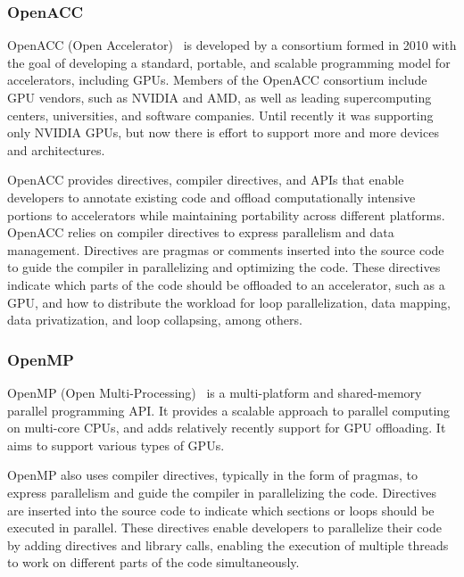 \subsubsection{OpenACC}

\par
OpenACC (Open Accelerator)~\cite{openacc} is developed by a consortium formed in 2010 with the goal of developing a standard, portable, and scalable programming model for accelerators, including GPUs.
Members of the OpenACC consortium include GPU vendors, such as NVIDIA and AMD, as well as leading supercomputing centers, universities, and software companies.
Until recently it was supporting only NVIDIA GPUs, but now there is effort to support more and more devices and architectures.


\par
OpenACC provides directives, compiler directives, and APIs that enable developers to annotate existing code and offload computationally intensive portions to accelerators while maintaining portability across different platforms.
OpenACC relies on compiler directives to express parallelism and data management.
Directives are pragmas or comments inserted into the source code to guide the compiler in parallelizing and optimizing the code.
These directives indicate which parts of the code should be offloaded to an accelerator, such as a GPU, and how to distribute the workload for loop parallelization, data mapping, data privatization, and loop collapsing, among others.


\subsubsection{OpenMP}


\par
OpenMP (Open Multi-Processing)~\cite{openmp} is a multi-platform and shared-memory parallel programming API.
It provides a scalable approach to parallel computing on multi-core CPUs, and adds relatively recently support for GPU offloading.
It aims to support various types of GPUs.


\par
OpenMP also uses compiler directives, typically in the form of pragmas, to express parallelism and guide the compiler in parallelizing the code.
Directives are inserted into the source code to indicate which sections or loops should be executed in parallel.
These directives enable developers to parallelize their code by adding directives and library calls, enabling the execution of multiple threads to work on different parts of the code simultaneously.


